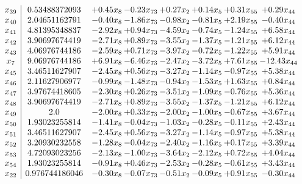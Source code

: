 \documentclass[8pt]{article}
\begin{document}
\[\begin{array}{c| c c@{\hskip 2pt} c@{\hskip 2pt} c@{\hskip 2pt} c@{\hskip 2pt} c@{\hskip 2pt} c@{\hskip 2pt} }
 x_{39}   &  0.53488372093 & +  0.45 x_{8} & -0.23 x_{73} & +  0.27 x_{2} & +  0.14 x_{5} & +  0.31 x_{55} & +  0.29 x_{44}\\
 x_{40}   &  2.04651162791 & -0.40 x_{8} & -1.86 x_{73} & -0.98 x_{2} & -0.81 x_{5} & +  2.19 x_{55} & -0.40 x_{44}\\
 x_{41}   &  4.81395348837 & -2.92 x_{8} & +  0.94 x_{73} & -4.59 x_{2} & -0.74 x_{5} & -1.24 x_{55} & +  6.58 x_{44}\\
 x_{42}   &  3.90697674419 & -2.71 x_{8} & +  0.89 x_{73} & -3.55 x_{2} & -1.37 x_{5} & -1.21 x_{55} & +  6.12 x_{44}\\
 x_{43}   &  4.06976744186 & -2.59 x_{8} & +  0.71 x_{73} & -3.97 x_{2} & -0.72 x_{5} & -1.22 x_{55} & +  5.91 x_{44}\\
 x_{7}   &  9.06976744186 & +  6.91 x_{8} & -6.46 x_{73} & -2.47 x_{2} & -3.72 x_{5} & +  7.61 x_{55} & -12.43 x_{44}\\
 x_{45}   &  3.46511627907 & -2.45 x_{8} & +  0.56 x_{73} & -3.27 x_{2} & -1.14 x_{5} & -0.97 x_{55} & +  5.38 x_{44}\\
 x_{46}   &  2.11627906977 & -0.99 x_{8} & -1.48 x_{73} & -0.94 x_{2} & -1.53 x_{5} & +  1.63 x_{55} & +  0.84 x_{44}\\
 x_{47}   &  3.97674418605 & -2.30 x_{8} & +  0.26 x_{73} & -3.51 x_{2} & -1.09 x_{5} & -0.76 x_{55} & +  5.36 x_{44}\\
 x_{48}   &  3.90697674419 & -2.71 x_{8} & +  0.89 x_{73} & -3.55 x_{2} & -1.37 x_{5} & -1.21 x_{55} & +  6.12 x_{44}\\
 x_{49}   &  2.0 & -2.00 x_{8} & +  0.33 x_{73} & -2.00 x_{2} & -1.00 x_{5} & -0.67 x_{55} & +  3.67 x_{44}\\
 x_{50}   &  1.93023255814 & -1.41 x_{8} & -0.04 x_{73} & -1.03 x_{2} & -0.28 x_{5} & -0.11 x_{55} & +  2.43 x_{44}\\
 x_{51}   &  3.46511627907 & -2.45 x_{8} & +  0.56 x_{73} & -3.27 x_{2} & -1.14 x_{5} & -0.97 x_{55} & +  5.38 x_{44}\\
 x_{52}   &  3.20930232558 & -1.28 x_{8} & -0.04 x_{73} & -2.40 x_{2} & -1.16 x_{5} & +  0.17 x_{55} & +  3.39 x_{44}\\
 x_{53}   &  4.72093023256 & -2.13 x_{8} & -1.00 x_{73} & -3.64 x_{2} & -2.12 x_{5} & +  0.72 x_{55} & +  4.04 x_{44}\\
 x_{54}   &  1.93023255814 & -0.91 x_{8} & +  0.46 x_{73} & -2.53 x_{2} & -0.28 x_{5} & -0.61 x_{55} & +  3.43 x_{44}\\
 x_{22}   &  0.976744186046 & -0.30 x_{8} & -0.07 x_{73} & -0.51 x_{2} & -0.09 x_{5} & +  0.91 x_{55} & -0.30 x_{44}\\

\end{array}\]
\end{document}
